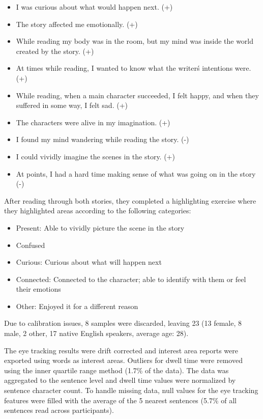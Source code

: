 \documentclass[11pt]{article}
\begin{document}
\begin{itemize}
  \item I was curious about what would happen next. (+)
  \item The story affected me emotionally. (+)
  \item While reading my body was in the room, but my mind was inside the world created by the story. (+)
  \item At times while reading, I wanted to know what the writer\'s intentions were. (+)
  \item While reading, when a main character succeeded, I felt happy, and when they suffered in some way, I felt sad. (+)
  \item The characters were alive in my imagination. (+)
  \item I found my mind wandering while reading the story. (-)
  \item I could vividly imagine the scenes in the story. (+)
  \item At points, I had a hard time making sense of what was going on in the story (-)
\end{itemize}

After reading through both stories, they completed a highlighting exercise where they highlighted areas according to the following categories:

\begin{itemize}
  \item Present: Able to vividly picture the scene in the story
  \item Confused
  \item Curious: Curious about what will happen next
  \item Connected: Connected to the character; able to identify with them or feel their emotions
  \item Other: Enjoyed it for a different reason
\end{itemize}

Due to calibration issues, 8 samples were discarded, leaving 23 (13 female, 8 male, 2 other, 17 native English speakers, average age: 28).

The eye tracking results were drift corrected and interest area reports were exported using words as interest areas. Outliers for dwell time were removed using the inner quartile range method (1.7\% of the data). The data was aggregated to the sentence level and dwell time values were normalized by sentence character count. To handle missing data, null values for the eye tracking features were filled with the average of the 5 nearest sentences (5.7\% of all sentences read across participants).
\end{document}
